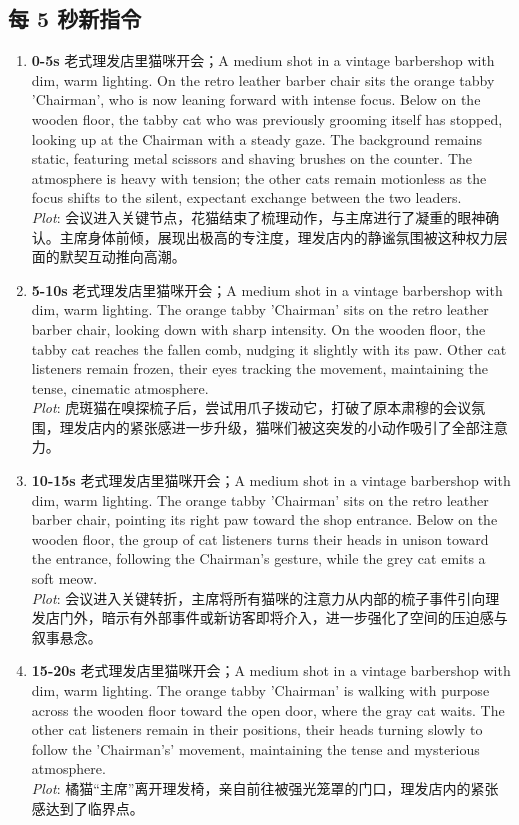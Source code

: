 \documentclass[11pt,a4paper]{article}
\begin{document}
\subsection*{每 5 秒新指令}
\begin{enumerate}
\item \textbf{0-5s} 老式理发店里猫咪开会；A medium shot in a vintage barbershop with dim, warm lighting. On the retro leather barber chair sits the orange tabby 'Chairman', who is now leaning forward with intense focus. Below on the wooden floor, the tabby cat who was previously grooming itself has stopped, looking up at the Chairman with a steady gaze. The background remains static, featuring metal scissors and shaving brushes on the counter. The atmosphere is heavy with tension; the other cats remain motionless as the focus shifts to the silent, expectant exchange between the two leaders.\\\newline \textit{Plot}: 会议进入关键节点，花猫结束了梳理动作，与主席进行了凝重的眼神确认。主席身体前倾，展现出极高的专注度，理发店内的静谧氛围被这种权力层面的默契互动推向高潮。
\item \textbf{5-10s} 老式理发店里猫咪开会；A medium shot in a vintage barbershop with dim, warm lighting. The orange tabby 'Chairman' sits on the retro leather barber chair, looking down with sharp intensity. On the wooden floor, the tabby cat reaches the fallen comb, nudging it slightly with its paw. Other cat listeners remain frozen, their eyes tracking the movement, maintaining the tense, cinematic atmosphere.\\\newline \textit{Plot}: 虎斑猫在嗅探梳子后，尝试用爪子拨动它，打破了原本肃穆的会议氛围，理发店内的紧张感进一步升级，猫咪们被这突发的小动作吸引了全部注意力。
\item \textbf{10-15s} 老式理发店里猫咪开会；A medium shot in a vintage barbershop with dim, warm lighting. The orange tabby 'Chairman' sits on the retro leather barber chair, pointing its right paw toward the shop entrance. Below on the wooden floor, the group of cat listeners turns their heads in unison toward the entrance, following the Chairman's gesture, while the grey cat emits a soft meow.\\\newline \textit{Plot}: 会议进入关键转折，主席将所有猫咪的注意力从内部的梳子事件引向理发店门外，暗示有外部事件或新访客即将介入，进一步强化了空间的压迫感与叙事悬念。
\item \textbf{15-20s} 老式理发店里猫咪开会；A medium shot in a vintage barbershop with dim, warm lighting. The orange tabby 'Chairman' is walking with purpose across the wooden floor toward the open door, where the gray cat waits. The other cat listeners remain in their positions, their heads turning slowly to follow the 'Chairman's' movement, maintaining the tense and mysterious atmosphere.\\\newline \textit{Plot}: 橘猫“主席”离开理发椅，亲自前往被强光笼罩的门口，理发店内的紧张感达到了临界点。

\end{enumerate}
\end{document}
